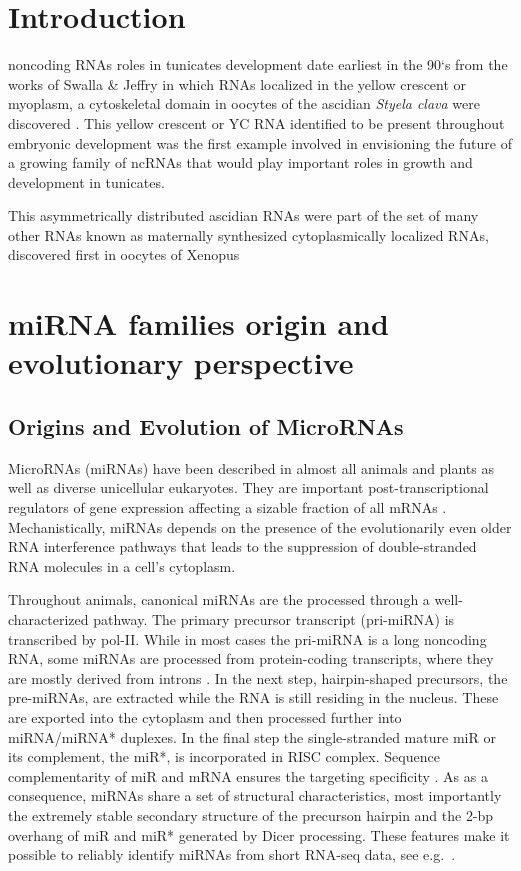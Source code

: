 \documentclass[graybox]{svmult}
\begin{document}
\section{Introduction}
\label{sec:1}

noncoding RNAs roles in tunicates development date earliest in the 90`s from the works of Swalla \& Jeffry in which RNAs localized in the yellow crescent or myoplasm, a cytoskeletal domain in oocytes of the ascidian \textit{Styela clava} were discovered \cite{Swalla1995}. This  yellow crescent or YC RNA identified to be present throughout embryonic development was the first example involved in envisioning the future of a growing family of ncRNAs that would play important roles in growth and development in tunicates\cite{Swalla1995}.

This asymmetrically distributed ascidian RNAs were part of the set of many other RNAs known as maternally synthesized cytoplasmically localized RNAs, discovered first in oocytes of Xenopus \cite{Bashirullah1998}

\section{miRNA families origin and evolutionary perspective}
\label{sec:2}

\subsection{Origins and Evolution of MicroRNAs}

MicroRNAs (miRNAs) have been described in almost all animals and plants as
well as diverse unicellular eukaryotes. They are important
post-transcriptional regulators of gene expression affecting a sizable
fraction of all mRNAs \cite{Ameres:13}. Mechanistically, miRNAs depends on
the presence of the evolutionarily even older RNA interference pathways
\cite{Cerutti:06,Shabalina:08} that leads to the suppression of
double-stranded RNA molecules in a cell's cytoplasm. 

Throughout animals, canonical miRNAs are the processed through a
well-characterized pathway. The primary precursor transcript (pri-miRNA) is
transcribed by pol-II. While in most cases the pri-miRNA is a long
noncoding RNA, some miRNAs are processed from protein-coding transcripts,
where they are mostly derived from introns \cite{Lin:06}. In the next step,
hairpin-shaped precursors, the pre-miRNAs, are extracted while the RNA is
still residing in the nucleus. These are exported into the cytoplasm
\cite{Lund:04} and then processed further into miRNA/miRNA* duplexes.  In
the final step the single-stranded mature miR or its complement, the miR*,
is incorporated in RISC complex. Sequence complementarity of miR and mRNA
ensures the targeting specificity \cite{Bartel:13}. As as a consequence,
miRNAs share a set of structural characteristics, most importantly the
extremely stable secondary structure of the precurson hairpin and the 2-bp
overhang of miR and miR* generated by Dicer processing. These features make
it possible to reliably identify miRNAs from short RNA-seq data, see e.g.\
\cite{Langenberger:10a,Friedlaender:12,Langenberger:13a}.
\end{document}
